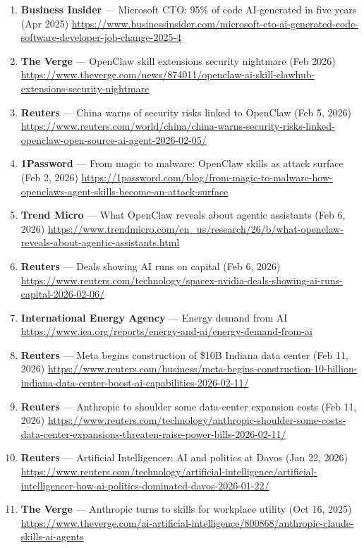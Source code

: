 \documentclass[
]{article}
\begin{document}
\begin{enumerate}
\item
  \textbf{Business Insider} --- Microsoft CTO: 95\% of code AI-generated
  in five years (Apr 2025)
  \url{https://www.businessinsider.com/microsoft-cto-ai-generated-code-software-developer-job-change-2025-4}
\item
  \textbf{The Verge} --- OpenClaw skill extensions security nightmare
  (Feb 2026)
  \url{https://www.theverge.com/news/874011/openclaw-ai-skill-clawhub-extensions-security-nightmare}
\item
  \textbf{Reuters} --- China warns of security risks linked to OpenClaw
  (Feb 5, 2026)
  \url{https://www.reuters.com/world/china/china-warns-security-risks-linked-openclaw-open-source-ai-agent-2026-02-05/}
\item
  \textbf{1Password} --- From magic to malware: OpenClaw skills as
  attack surface (Feb 2, 2026)
  \url{https://1password.com/blog/from-magic-to-malware-how-openclaws-agent-skills-become-an-attack-surface}
\item
  \textbf{Trend Micro} --- What OpenClaw reveals about agentic
  assistants (Feb 6, 2026)
  \url{https://www.trendmicro.com/en_us/research/26/b/what-openclaw-reveals-about-agentic-assistants.html}
\item
  \textbf{Reuters} --- Deals showing AI runs on capital (Feb 6, 2026)
  \url{https://www.reuters.com/technology/spacex-nvidia-deals-showing-ai-runs-capital-2026-02-06/}
\item
  \textbf{International Energy Agency} --- Energy demand from AI
  \url{https://www.iea.org/reports/energy-and-ai/energy-demand-from-ai}
\item
  \textbf{Reuters} --- Meta begins construction of \$10B Indiana data
  center (Feb 11, 2026)
  \url{https://www.reuters.com/business/meta-begins-construction-10-billion-indiana-data-center-boost-ai-capabilities-2026-02-11/}
\item
  \textbf{Reuters} --- Anthropic to shoulder some data-center expansion
  costs (Feb 11, 2026)
  \url{https://www.reuters.com/technology/anthropic-shoulder-some-costs-data-center-expansions-threaten-raise-power-bills-2026-02-11/}
\item
  \textbf{Reuters} --- Artificial Intelligencer: AI and politics at
  Davos (Jan 22, 2026)
  \url{https://www.reuters.com/technology/artificial-intelligence/artificial-intelligencer-how-ai-politics-dominated-davos-2026-01-22/}
\item
  \textbf{The Verge} --- Anthropic turns to skills for workplace utility
  (Oct 16, 2025)
  \url{https://www.theverge.com/ai-artificial-intelligence/800868/anthropic-claude-skills-ai-agents}
\end{enumerate}
\end{document}
